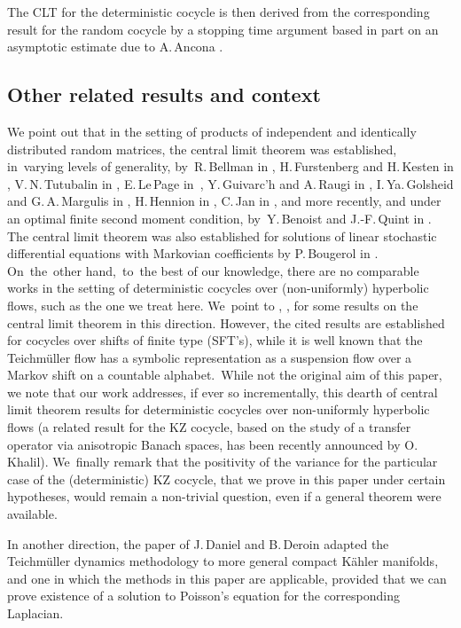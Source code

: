 \documentclass[10pt]{amsart}
\theoremstyle{plain}
\theoremstyle{definition}
\numberwithin{equation}{subsection}
\newcommand{\Tm}{Teichmüller\xspace}
\begin{document}
The CLT for the deterministic cocycle is then derived from the corresponding result for the random cocycle by a stopping time argument based in part on an asymptotic estimate due to A.\,Ancona \cite{Anc90}.%

\subsection{Other related results and context} We point out that in the setting of products of independent and identically distributed random matrices, the central limit theorem was established, in~varying levels of generality, by~R.\,Bellman in \cite{B54}, H.\,Furstenberg and H.\,Kesten in \cite{FK60}, V.\,N.\,Tutubalin in \cite{T77}, E.\,Le\,Page in~\cite{LP82}, Y.\,Guivarc'h and A.\,Raugi in \cite{GR85}, I.\,Ya.\,Golsheid and G.\,A.\,Margulis in \cite{GM89}, H.\,Hennion in \cite{H97}, C.\,Jan in \cite{J00}, and more recently, and under an optimal finite second moment condition, by~Y.\,Benoist and J.-F.\,Quint in \cite{BQ16}. The central limit theorem was also established for solutions of linear stochastic differential equations with Markovian coefficients by P.\,Bougerol in \cite{B88}. On~the~other hand,~to~the best of our knowledge, there are no comparable works in the setting of deterministic cocycles over (non-uniformly) hyperbolic flows, such as the one we treat here. We~point to \cite{DKP21}, \cite{FK21}, \cite{PP22} for some results on the central limit theorem in this direction. However, the cited results are established for cocycles over shifts of finite type (SFT's), while it is well known that the Teichmüller flow has a symbolic representation as a suspension flow over a Markov shift on a countable alphabet.~While not the original aim of this paper, we note that our work addresses, if ever so incrementally, this dearth of central limit theorem results for deterministic cocycles over non-uniformly hyperbolic flows (a related result for the KZ cocycle, based on the study of a transfer operator via anisotropic Banach spaces, has been recently announ\-ced by O.\,Khalil). We~finally remark that the positivity of the variance for the particular case of the (deterministic) KZ cocycle, that we prove in this paper under certain hypotheses, would remain a non-trivial question, even if a general theorem were available.

In another direction, the paper of J.\,Daniel and B.\,Deroin \cite{DD19} adapted the \Tm dynamics methodology to more general compact Kähler manifolds, and one in which the methods in this paper are applicable, provided that we can prove existence of a solution to Poisson's equation for the corresponding Laplacian.
\end{document}
